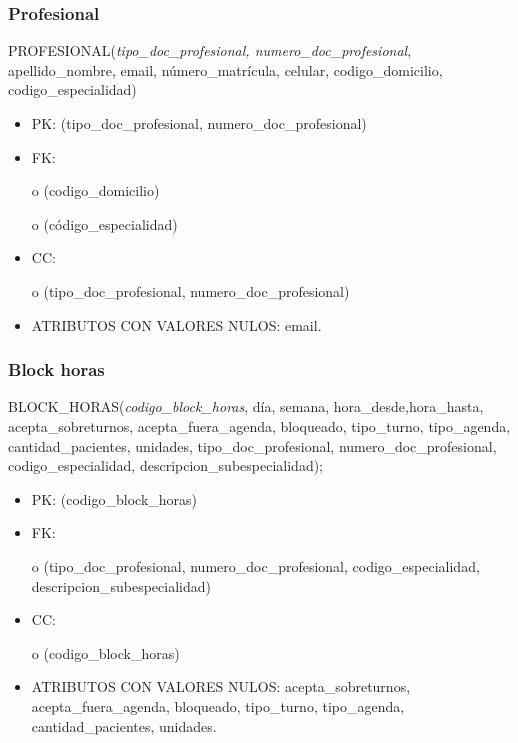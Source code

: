\documentclass[a4paper,11pt]{article}
\begin{document}
\subsubsection{\textbf{Profesional}}

PROFESIONAL(\emph{tipo\_doc\_profesional, numero\_doc\_profesional}, apellido\_nombre, 
email, número\_matrícula, celular,\textit{\textbf{ }}codigo\_domicilio, codigo\_especialidad)

\begin{itemize}
\item PK: (tipo\_doc\_profesional, numero\_doc\_profesional)

\item FK: 

o (codigo\_domicilio)

o (código\_especialidad)

\item CC:

o (tipo\_doc\_profesional, numero\_doc\_profesional) 

\item ATRIBUTOS CON VALORES NULOS:  email.\label{HToc293405840}
\end{itemize}

\subsubsection{\textbf{Block horas}}

BLOCK\_HORAS(\emph{codigo\_block\_horas}, día, semana, hora\_desde,hora\_hasta, 
acepta\_sobreturnos, acepta\_fuera\_agenda, bloqueado, tipo\_turno, tipo\_agenda, 
cantidad\_pacientes, unidades,\emph{ }tipo\_doc\_profesional, numero\_doc\_profesional, 
codigo\_especialidad, descripcion\_subespecialidad);

\begin{itemize}
\item PK: (codigo\_block\_horas)

\item FK: 

o (tipo\_doc\_profesional, numero\_doc\_profesional, codigo\_especialidad, descripcion\_subespecialidad)

\item CC:

o (codigo\_block\_horas)

\item ATRIBUTOS CON VALORES NULOS: acepta\_sobreturnos, acepta\_fuera\_agenda, bloqueado, 
tipo\_turno, tipo\_agenda, cantidad\_pacientes, unidades.\label{HToc293405841}
\end{itemize}
\end{document}
